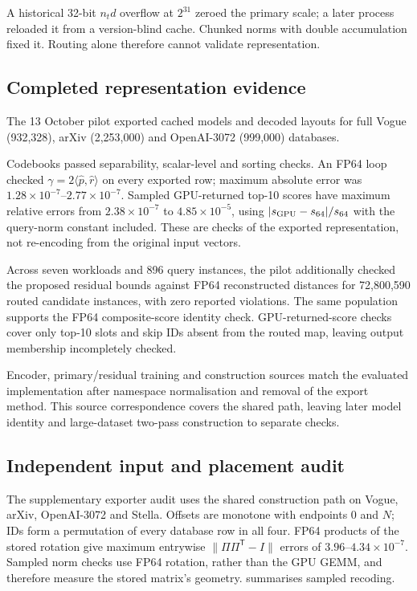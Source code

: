 A historical 32-bit $n_td$ overflow at $2^{31}$ zeroed the primary scale; a later process reloaded it from a version-blind cache. Chunked norms with double accumulation fixed it. Routing alone therefore cannot validate representation.

\subsection{Completed representation evidence}

The 13 October pilot exported cached models and decoded layouts for full Vogue (932,328), arXiv (2,253,000) and OpenAI-3072 (999,000) databases.

Codebooks passed separability, scalar-level and sorting checks. An FP64 loop checked $\gamma=2\langle\widehat p,\widehat r\rangle$ on every exported row; maximum absolute error was $1.28\times10^{-7}$--$2.77\times10^{-7}$. Sampled GPU-returned
top-10 scores have maximum relative errors from $2.38\times10^{-7}$ to
$4.85\times10^{-5}$, using $|s_{\rm GPU}-s_{64}|/s_{64}$ with the
query-norm constant included. These are checks of the exported
representation, not re-encoding from the original input vectors.


Across seven workloads and 896 query instances, the pilot additionally
checked the proposed residual bounds against FP64 reconstructed distances
for 72,800,590 routed candidate instances, with zero reported violations.
The same population supports the FP64 composite-score identity check.
GPU-returned-score checks cover only top-10 slots and skip IDs absent
from the routed map, leaving output membership incompletely checked.

Encoder, primary/residual training and construction sources match the
evaluated implementation after namespace normalisation and removal of
the export method. This source
correspondence covers the shared path, leaving later model identity and
large-dataset two-pass construction to separate checks.

\subsection{Independent input and placement audit}
\label{sec:4-representation-audit}

The supplementary exporter audit uses the shared construction path on
Vogue, arXiv, OpenAI-3072 and Stella. Offsets are monotone with endpoints
0 and $N$; IDs form a permutation of every database row in all four.
FP64 products of the stored rotation give maximum entrywise
$\|\Pi\Pi^{\mathsf T}-I\|$ errors of $3.96$--$4.34\times10^{-7}$.
Sampled norm checks use FP64 rotation, rather than the GPU GEMM, and
therefore measure the stored matrix's geometry.
 summarises sampled recoding.

